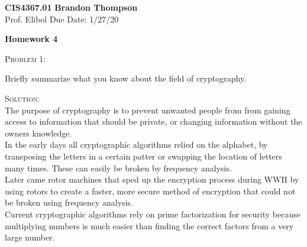\documentclass[12pt]{article}
\newenvironment{problem}[1]
{\begin{mdframed}[linewidth=0.8pt]
        \textsc{Problem #1:}

}
    {\end{mdframed}}
\newenvironment{solution}
    {\textsc{Solution:}\\}
    {\newpage}%
\begin{document}
\noindent
\textbf{CIS4367.01} \hfill \textbf{Brandon Thompson} \\
\normalsize Prof. Elibol \hfill Due Date: 1/27/20 \\

\begin{center}
\textbf{Homework 4}
\end{center}
	\begin{problem}{1}
		Briefly summarize what you know about the field of
		cryptography.
	\end{problem}
	\begin{solution}
		The purpose of cryptography is to prevent unwanted people from from gaining
		access to information that should be private, or changing information without
		the owners knowledge.\\ In the early days all cryptographic algorithms relied
		on the alphabet, by transposing the letters in a certain patter or swapping
		the location of letters many times. These can easily be broken by frequency
		analysis. \\
		Later came rotor machines that sped up the encryption process
		during WWII by using rotors to create a faster, more secure method of encryption
		that could not be broken using frequency analysis. \\
		Current cryptographic algorithms rely on prime factorization for security
		because multiplying numbers is much easier than finding the correct
		factors from a very large  number.
	\end{solution}
	
\end{document}
